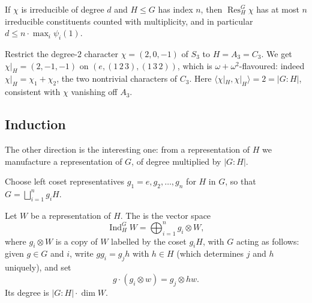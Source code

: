 \documentclass[a4paper]{scrartcl}
\newcommand{\Ind}{\operatorname{Ind}}
\newcommand{\Res}{\operatorname{Res}}
\newcommand{\ip}[2]{\langle #1, #2 \rangle}
\begin{document}
\begin{corollary}
	If $\chi$ is irreducible of degree $d$ and $H\leq G$ has index $n$, then $\Res^G_H\chi$ has at most $n$ irreducible constituents counted with multiplicity, and in particular $d \leq n\cdot\max_i\psi_i(1)$.
\end{corollary}

\begin{example}
	Restrict the degree-$2$ character $\chi = (2,0,-1)$ of $S_3$ to $H = A_3 = C_3$. We get $\chi|_H = (2,-1,-1)$ on $(e, (1\,2\,3),(1\,3\,2))$, which is $\omega + \omega^2$-flavoured: indeed $\chi|_H = \chi_1 + \chi_2$, the two nontrivial characters of $C_3$. Here $\ip{\chi|_H}{\chi|_H} = 2 = |G:H|$, consistent with $\chi$ vanishing off $A_3$.
\end{example}

\subsection{Induction}

The other direction is the interesting one: from a representation of $H$ we manufacture a representation of $G$, of degree multiplied by $|G:H|$.

Choose left coset representatives $g_1 = e, g_2,\dots,g_n$ for $H$ in $G$, so that $G = \bigsqcup_{i=1}^n g_iH$.

\begin{center}
\end{center}
\vspace{1.4em}

\begin{definition}
	Let $W$ be a representation of $H$. The  is the vector space
	$$\Ind_H^GW = \bigoplus_{i=1}^n g_i\otimes W,$$
	where $g_i\otimes W$ is a copy of $W$ labelled by the coset $g_iH$, with $G$ acting as follows: given $g \in G$ and $i$, write $g g_i = g_j h$ with $h \in H$ (which determines $j$ and $h$ uniquely), and set
	$$g\cdot(g_i\otimes w) = g_j\otimes hw.$$
	Its degree is $|G:H|\cdot\dim W$.
\end{definition}
\end{document}
